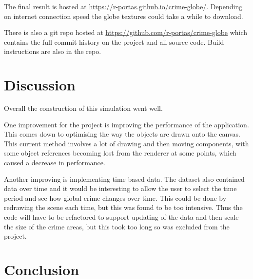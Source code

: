 \documentclass[]{article}
\begin{document}
The final result is hosted at \url{https://r-portas.github.io/crime-globe/}.
Depending on internet connection speed the globe textures could take a while to download.

There is also a git repo hosted at \url{https://github.com/r-portas/crime-globe} which contains the
full commit history on the project and all source code.
Build instructions are also in the repo.

\section{Discussion}

Overall the construction of this simulation went well.

One improvement for the project is improving the performance of the application.
This comes down to optimising the way the objects are drawn onto the canvas.
This current method involves a lot of drawing and then moving components, with
some object references becoming lost from the renderer at some points, which
caused a decrease in performance.

Another improving is implementing time based data.
The dataset also contained data over time and it would be
interesting to allow the user to select the time period and see how global crime changes over time.
This could be done by redrawing the scene each time, but this was found to be too intensive.
Thus the code will have to be refactored to support updating of the data and then scale the size
of the crime areas, but this took too long so was excluded from the project.

\section{Conclusion}
\end{document}
